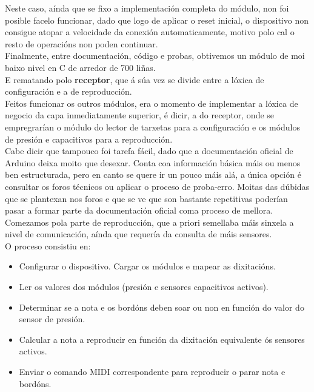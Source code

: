    Neste caso, aínda que se fixo a implementación completa do módulo, non foi
   posible facelo funcionar, dado que logo de aplicar o reset inicial, o
   dispositivo non consigue atopar a velocidade da conexión automaticamente,
   motivo polo cal o resto de operacións non poden continuar. \\
   
   Finalmente, entre documentación, código e probas, obtivemos un módulo de moi
   baixo nivel en C de arredor de 700 liñas. \\
   
   E rematando polo \textbf{receptor}, que á súa vez se divide entre a lóxica
   de configuración e a de reproducción. \\
   
   Feitos funcionar os outros módulos, era o momento de implementar a lóxica de
   negocio da capa inmediatamente superior, é dicir, a do receptor, onde se
   empregrarían o módulo do lector de tarxetas para a configuración e os módulos
   de presión e capacitivos para a reproducción. \\
   
   Cabe dicir que tampouco foi tarefa fácil, dado que a documentación oficial de
   Arduino deixa moito que desexar. Conta coa información básica máis ou menos
   ben estructurada, pero en canto se quere ir un pouco máis alá, a única opción
   é consultar os foros técnicos ou aplicar o proceso de proba-erro. Moitas das
   dúbidas que se plantexan nos foros e que se ve que son bastante repetitivas
   poderían pasar a formar parte da documentación oficial coma proceso de
   mellora. \\
   
   Comezamos pola parte de reproducción, que a priori semellaba máis sinxela a
   nivel de comunicación, aínda que requería da consulta de máis sensores. \\
   
   O proceso consistiu en:
    
   \begin{itemize}
    \item Configurar o dispositivo. Cargar os módulos e mapear as dixitacións.
    \item Ler os valores dos módulos (presión e sensores capacitivos activos).
    \item Determinar se a nota e os bordóns deben soar ou non en función do
        valor do sensor de presión.
    \item Calcular a nota a reproducir en función da dixitación equivalente ós
        sensores activos.
    \item Enviar o comando MIDI correspondente para reproducir o parar nota e
        bordóns.
   \end{itemize}
   
